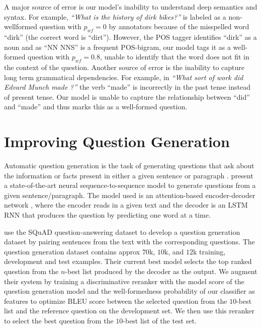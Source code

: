 \documentclass[11pt,a4paper]{article}
\newcommand{\ignore}[1]{}
\begin{document}
A major source of error is our model's inability to understand deep semantics and syntax.
For example, \textit{``What is the history of dirk bikes?''} is labeled as a non-wellformed
question with $p_{wf}=0$ by annotators because of the misspelled word ``dirk'' (the correct 
word is ``dirt''). However, the POS tagger identifies ``dirk'' as a noun and as ``NN NNS'' 
is a frequent POS-bigram, our model tags it as a well-formed question with $p_{wf}=0.8$,
unable to identify that the word does not fit in the context of the question.
Another source of error is the inability to capture long term grammatical dependencies. For
example, in \textit{``What sort of work did Edvard Munch made ?''} the verb ``made'' is
incorrectly in the past tense instead of present tense. Our model is unable to capture
the relationship between ``did'' and ``made'' and thus marks this as a well-formed
question.

\section{Improving Question Generation}
\label{sec:extrinsic}

Automatic question generation is the task of generating questions that ask about the
information or facts present in either a given sentence or paragraph
\cite{Vanderwende:2008,Heilman:2010}.  present a state-of-the-art
neural sequence-to-sequence model to generate questions from a given sentence/paragraph.
The model used is an attention-based encoder-decoder network \cite{attention},
where the encoder reads in  a given text and the decoder is an LSTM RNN that
produces the  question by predicting one word at a time. \ignore{conditioned on the current
hidden layer and the attention-weighted hidden layers of the encoder.}

 use the SQuAD question-answering dataset \cite{squad} to
develop a question generation dataset by pairing sentences from the text with the
corresponding questions. 
The question generation dataset contains approx $70$k, $10$k, and $12$k training, development and test examples.
Their current best model selects the
top ranked question from the $n$-best list produced by the decoder as the output.
We augment their system by training a discriminative reranker
\cite{collins:2005} with the model score of the question generation model and the
well-formedness probability of our classifier as features to optimize BLEU score
\cite{bleu} between the selected question from the $10$-best list and the reference
question on the development set. We then use this reranker to select the best question
from the $10$-best list of the test set.
\end{document}
